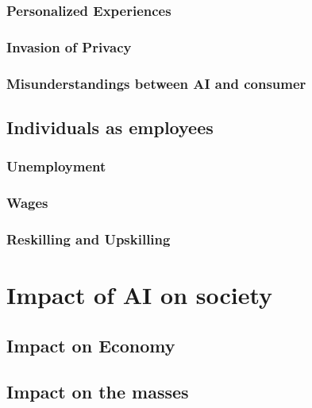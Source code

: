 \documentclass[man]{apa6}
\begin{document}
\subsubsection*{Personalized Experiences}
\cite{Puntoni2021}

\subsubsection*{Invasion of Privacy}

\subsubsection*{Misunderstandings between AI and consumer}

\subsection*{Individuals as employees}
\subsubsection*{Unemployment}
\subsubsection*{Wages}
\subsubsection*{Reskilling and Upskilling}

\section*{Impact of AI on society}
\subsection*{Impact on Economy}

\subsection*{Impact on the masses}
\end{document}
